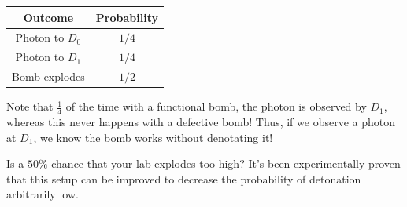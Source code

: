     \begin{center}
        \begin{tabular}{|c|c|}
            \hline
            \textbf{Outcome} & \textbf{Probability} \\
            \hline
            Photon to $D_0$ & $1/4$   \\
            Photon to $D_1$ & $1/4$  \\
            Bomb explodes   & $1/2$  \\
            \hline
        \end{tabular}       
    \end{center}
    
    Note that $\frac{1}{4}$ of the time with a functional bomb, the photon is observed by $D_1$, whereas this never happens with a defective bomb! Thus, if we observe a photon at $D_1$, we know the bomb works without denotating it!
    
    \begin{framedrmk*}[Improvements]
       Is a $50\%$ chance that your lab explodes too high? It's been experimentally proven that this setup can be improved to decrease the probability of detonation arbitrarily low.
    \end{framedrmk*}